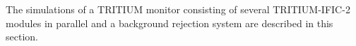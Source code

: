 The simulations of a TRITIUM monitor consisting of several TRITIUM-IFIC-2 modules in parallel and a background rejection system are described in this section.